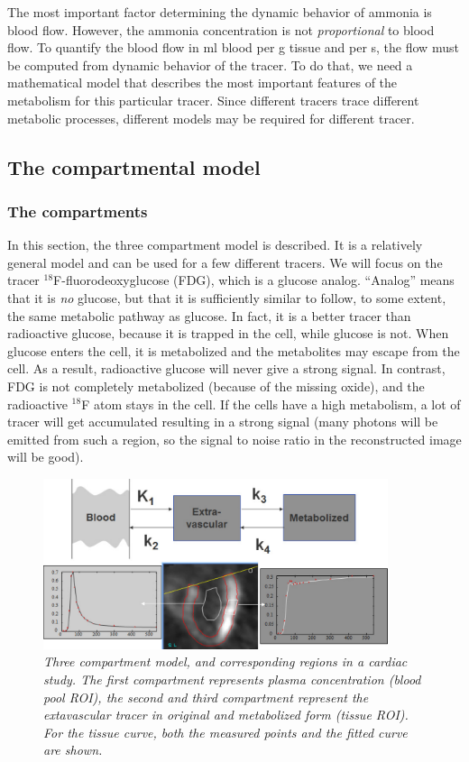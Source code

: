 The most important factor determining the dynamic behavior of ammonia
is blood flow. However, the ammonia concentration is not {\em
proportional} to blood flow. To quantify the blood flow in ml blood
per g tissue and per s, the flow must be computed from dynamic
behavior of the tracer. To do that, we need a mathematical model that
describes the most important features of the metabolism for this
particular tracer. Since different tracers trace different metabolic
processes, different models may be required for different tracer.

\subsection{The compartmental model}
\subsubsection{The compartments}
In this section, the three compartment model is described. It is a
relatively general model and can be used for a few different
tracers. We will focus on the tracer $^{18}$F-fluorodeoxyglucose
(FDG), which is a glucose analog.  ``Analog'' means that it is {\em
no} glucose, but that it is sufficiently similar to follow, to some
extent, the same metabolic pathway as glucose. In fact, it is a better
tracer than radioactive glucose, because it is trapped in the cell,
while glucose is not. When glucose enters the cell, it is metabolized
and the metabolites may escape from the cell. As a result, radioactive
glucose will never give a strong signal. In contrast, FDG is not
completely metabolized (because of the missing oxide), and the
radioactive $^{18}$F atom stays in the cell. If the cells have a high
metabolism, a lot of tracer will get accumulated resulting in a strong
signal (many photons will be emitted from such a region, so the signal
to noise ratio in the reconstructed image will be good).

\begin{figure}[tb]
\centering
\includegraphics[width=0.9\textwidth]{figs/fig_kinemodel.pdf}
\caption{\label{fig:kinemodel} \emph{Three compartment model, and
corresponding regions in a cardiac study. The first compartment represents
plasma concentration (blood pool ROI), the second and third compartment
represent the extavascular tracer in original and metabolized form (tissue
ROI). For the tissue curve, both the measured points and the fitted curve are
shown.}}
\end{figure}

